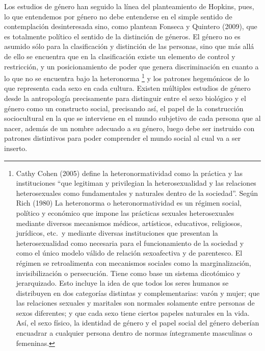 Los estudios de género han seguido la línea del planteamiento de Hopkins,
pues, lo que entendemos por género no debe entenderse en el simple sentido de
contemplación desinteresada sino, como plantean Fonseca y Quintero (2009), que
es totalmente político el sentido de la distinción de géneros.
El género no es asumido sólo para la clasificación y distinción de las personas,
sino que más allá de ello se encuentra que en la clasificación existe un
elemento de control y restricción, y un posicionamiento de poder que genera
discriminación en cuanto a lo que no se encuentra bajo la heteronorma
\footnote{Cathy Cohen (2005) define la heteronormatividad como la práctica y
las instituciones “que legitiman y privilegian la heterosexualidad y las
relaciones heterosexuales como fundamentales y naturales dentro de la
sociedad”. Según Rich (1980) La heteronorma o heteronormatividad
es un régimen social, político y económico que impone las prácticas sexuales
heterosexuales mediante diversos mecanismos médicos, artísticos, educativos,
religiosos, jurídicos, etc.\ y mediante diversas instituciones que presentan
la heterosexualidad como necesaria para el funcionamiento de la sociedad y como
el único modelo válido de relación sexoafectiva y de parentesco.
El régimen se retroalimenta con mecanismos sociales como la marginalización,
invisibilización o persecución.
Tiene como base un sistema dicotómico y jerarquizado.
Esto incluye la idea de que todos los seres humanos se distribuyen en dos
categorías distintas y complementarias: varón y mujer;
que las relaciones sexuales y maritales son normales solamente entre personas de
sexos diferentes;
y que cada sexo tiene ciertos papeles naturales en la vida.
Así, el sexo físico, la identidad de género y el papel social del género
deberían encuadrar a cualquier persona dentro de normas íntegramente masculinas
o femeninas.}
y los patrones hegemónicos de lo que representa cada sexo en cada cultura.
Existen múltiples estudios de género desde la antropología
precisamente para distinguir entre el sexo biológico y el género como un
constructo social, precisando así, el papel de la construcción sociocultural en
la que se interviene en el mundo subjetivo de cada persona que al nacer, además
de un nombre adecuado a su género, luego debe ser instruido con patrones
distintivos para poder comprender el mundo social al cual va a ser inserto.

